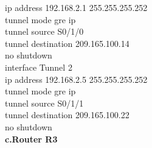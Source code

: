 \documentclass[12pt,a4paper]{report}
\begin{document}
{\hspace*{2cm}ip address 192.168.2.1 255.255.255.252\\
\hspace*{2cm}tunnel mode gre ip\\
\hspace*{2cm}tunnel source S0/1/0\\
\hspace*{2cm}tunnel destination 209.165.100.14\\
\hspace*{2cm}no shutdown\\
\hspace*{2cm}interface Tunnel 2\\
\hspace*{2cm}ip address 192.168.2.5 255.255.255.252\\
\hspace*{2cm}tunnel mode gre ip\\
\hspace*{2cm}tunnel source S0/1/1\\
\hspace*{2cm}tunnel destination 209.165.100.22\\
\hspace*{2cm}no shutdown\\}
\hspace*{1cm}\textbf{c.Router R3} \\
\end{document}
